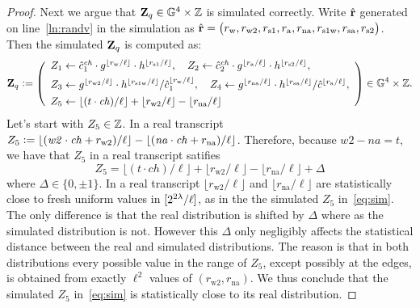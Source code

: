 \documentclass[11pt]{article}
\begin{document}
\begin{proof}
Next we argue that $\mathbf{Z}_q \in \mathbb G^4 \times \mathbb Z$ is simulated correctly. 
Write $\hat{\mathbf{r}}$ generated on line~\eqref{ln:randv} in the simulation
as $\hat{\mathbf{r}} = \big(r_\text{w}, r_\text{w2}, r_\text{s1}, r_\text{a}, r_\text{na}, r_\text{s1w}, r_\text{sa}, r_\text{s2} \big)$.
Then the simulated $\mathbf{Z}_q$ is computed as:
\begin{equation} \label{eq:sim}
\Zv_q \deq \left(\begin{array}{l}
Z_1 \gets \hat{c}_1^\mathit{ch} \cdot g^{\lfloor r_\text{w}/\ell \rfloor} \cdot h^{\lfloor r_\text{s1}/\ell \rfloor} ,\quad
Z_2 \gets \hat{c}_2^\mathit{ch} \cdot g^{\lfloor r_\text{a}/\ell \rfloor} \cdot h^{\lfloor r_\text{s2}/\ell \rfloor} , \AlgSep
Z_3 \gets g^{\lfloor r_\text{w2}/\ell \rfloor} \cdot h^{\lfloor r_\text{s1w}/\ell \rfloor} / \hat{c}_1^{\lfloor r_\text{w}/\ell \rfloor},\quad
Z_4 \gets g^{\lfloor r_\text{na}/\ell \rfloor} \cdot h^{\lfloor r_\text{sa}/\ell \rfloor} / \hat{c}^{\lfloor r_\text{a}/\ell \rfloor}, \AlgSep
Z_5 \gets \lfloor (t \cdot \mathit{ch})/\ell \rfloor + \lfloor r_\text{w2}/\ell \rfloor - \lfloor r_\text{na}/\ell \rfloor 
\end{array}\right) \in \GG^4 \times \ZZ.  
\end{equation}
Let's start with $Z_5 \in \mathbb Z$.  
In a real transcript 
$Z_5 \mathrel{\mathop:}= \lfloor (\mathit{w2} \cdot \mathit{ch} + r_\text{w2})/\ell \rfloor -
          \lfloor (\mathit{na} \cdot \mathit{ch} + r_\text{na})/\ell \rfloor$.
Therefore, because $\mathit{w2} - \mathit{na} = t$, we have
that $Z_5$ in a real transcript satifies
\[    Z_5 = \lfloor (t \cdot \mathit{ch})/\ell \rfloor + \lfloor r_\text{w2} / \ell \rfloor - \lfloor r_\text{na} / \ell \rfloor + \Delta \]
where $\Delta \in \{0, \pm 1\}$. 
In a real transcript $\lfloor r_\text{w2} / \ell \rfloor$ 
and $\lfloor r_\text{na} / \ell \rfloor$ 
are statistically close to fresh uniform values in $[{2^{2\lambda}/\ell}]$, 
as in the the simulated $Z_5$ in~\eqref{eq:sim}.
The only difference is that the real distribution is shifted by $\Delta$
where as the simulated distribution is not.  
However this $\Delta$ only negligibly affects the statistical distance
between the real and simulated distributions. 
The reason is that in both distributions 
every possible value in the range of $Z_5$, 
except possibly at the edges, 
is obtained from exactly $\ell^2$ values of $(r_\text{w2}, r_\text{na})$. 
We thus conclude that the simulated $Z_5$ in~\eqref{eq:sim} 
is statistically close to its real distribution.


\end{proof}
\end{document}
